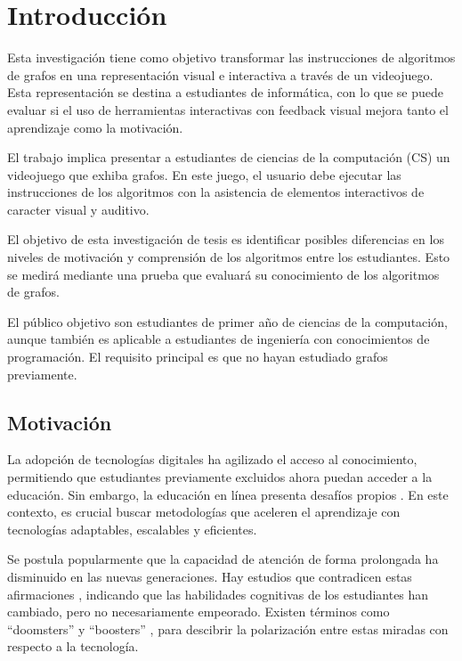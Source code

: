\chapter{Introducción}

Esta investigación tiene como objetivo transformar las instrucciones de algoritmos de grafos en una representación visual e interactiva a través de un videojuego. Esta representación se destina a estudiantes de informática, con lo que se puede evaluar si el uso de herramientas interactivas con feedback visual mejora tanto el aprendizaje como la motivación.

El trabajo implica presentar a estudiantes de ciencias de la computación (CS) un videojuego que exhiba grafos. En este juego, el usuario debe ejecutar las instrucciones de los algoritmos con la asistencia de elementos interactivos de caracter visual y auditivo.

El objetivo de esta investigación de tesis es identificar posibles diferencias en los niveles de motivación y comprensión de los algoritmos entre los estudiantes. Esto se medirá mediante una prueba que evaluará su conocimiento de los algoritmos de grafos.

El público objetivo son estudiantes de primer año de ciencias de la computación, aunque también es aplicable a estudiantes de ingeniería con conocimientos de programación. El requisito principal es que no hayan estudiado grafos previamente.

\section{Motivación}

La adopción de tecnologías digitales ha agilizado el acceso al conocimiento, permitiendo que estudiantes previamente excluidos ahora puedan acceder a la educación. Sin embargo, la educación en línea presenta desafíos propios \cite{UN2023ImpactDigitalTechnologies}. En este contexto, es crucial buscar metodologías que aceleren el aprendizaje con tecnologías adaptables, escalables y eficientes.

Se postula popularmente que la capacidad de atención de forma prolongada ha disminuido en las nuevas generaciones. Hay estudios que contradicen estas afirmaciones \cite{The_Role_of_Attention_Learning_Digital_Age}, indicando que las habilidades cognitivas de los estudiantes han cambiado, pero no necesariamente empeorado. Existen términos como ``doomsters'' y ``boosters'' \cite{Selwyn2014LookingF}, para descibrir la polarización entre estas miradas con respecto a la tecnología.

